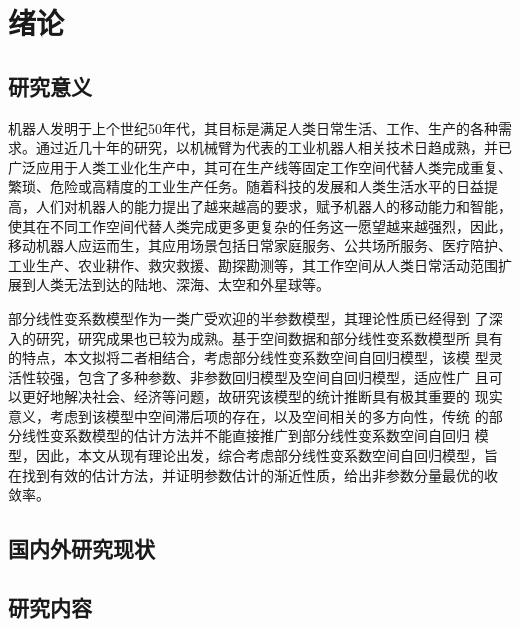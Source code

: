 \chapter{绪\quad 论} \label{chap:introduction}

\section{研究意义}

机器人发明于上个世纪50年代，其目标是满足人类日常生活、工作、生产的各种需求。通过近几十年的研究，以机械臂为代表的工业机器人相关技术日趋成熟，并已广泛应用于人类工业化生产中，其可在生产线等固定工作空间代替人类完成重复、繁琐、危险或高精度的工业生产任务。随着科技的发展和人类生活水平的日益提高，人们对机器人的能力提出了越来越高的要求，赋予机器人的移动能力和智能，使其在不同工作空间代替人类完成更多更复杂的任务这一愿望越来越强烈，因此，移动机器人应运而生，其应用场景包括日常家庭服务、公共场所服务、医疗陪护、工业生产、农业耕作、救灾救援、勘探勘测等，其工作空间从人类日常活动范围扩展到人类无法到达的陆地、深海、太空和外星球等。

部分线性变系数模型作为一类广受欢迎的半参数模型，其理论性质已经得到 了深入的研究，研究成果也已较为成熟。基于空间数据和部分线性变系数模型所 具有的特点，本文拟将二者相结合，考虑部分线性变系数空间自回归模型，该模 型灵活性较强，包含了多种参数、非参数回归模型及空间自回归模型，适应性广 且可以更好地解决社会、经济等问题，故研究该模型的统计推断具有极其重要的 现实意义，考虑到该模型中空间滞后项的存在，以及空间相关的多方向性，传统 的部分线性变系数模型的估计方法并不能直接推广到部分线性变系数空间自回归 模型，因此，本文从现有理论出发，综合考虑部分线性变系数空间自回归模型，旨 在找到有效的估计方法，并证明参数估计的渐近性质，给出非参数分量最优的收 敛率。

\section{国内外研究现状}
\lipsum[1-4]
\section{研究内容}

\lipsum[8-12]
